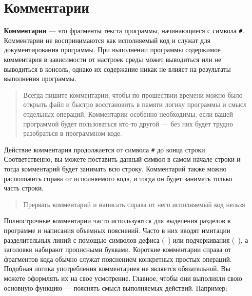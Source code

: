 \documentclass[]{book}
\begin{document}
\section*{Комментарии}

\textbf{Комментарии} --- это фрагменты текста программы, начинающиеся с
символа \texttt{\#}. Комментарии не воспринимаются как исполняемый код и
служат для документирования программы. При выполнении программы
содержимое комментария в зависимости от настроек среды может выводиться
или не выводиться в консоль, однако их содержание никак не влияет на
результаты выполнения программы.

\begin{quote}
Всегда пишите комментарии, чтобы по прошествии времени можно было
открыть файл и быстро восстановить в памяти логику программы и смысл
отдельных операций. Комментарии особенно необходимы, если вашей
программой будет пользоваться кто-то другой --- без них будет трудно
разобраться в программном коде.
\end{quote}

Действие комментария продолжается от символа \texttt{\#} до конца
строки. Соответственно, вы можете поставить данный символ в самом начале
строки и тогда комментарий будет занимать всю строку. Комментарий также
можно расположить справа от исполняемого кода, и тогда он будет занимать
только часть строки.

\begin{quote}
Прервать комментарий и написать справа от него исполняемый код нельзя
\end{quote}

Полнострочные комментарии часто используются для выделения разделов в
программе и написания объемных пояснений. Часто в них вводят имитации
разделительных линий с помощью символов дефиса (\texttt{-}) или
подчеркивания (\texttt{\_}), а заголовки набирают прописными буквами.
Короткие комментарии справа от фрагментов кода обычно служат пояснением
конкретных простых операций. Подобная логика употребления комментариев
не является обязательной. Вы можете оформлять их на свое усмотрение.
Главное, чтобы они выполняли свою основную функцию --- пояснять смысл
выполняемых действий. Например:
\end{document}

